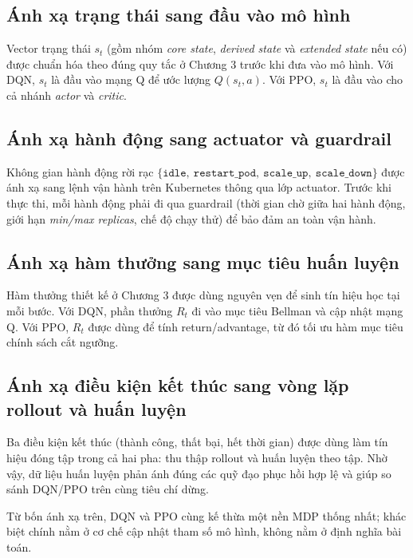 \subsection{Ánh xạ trạng thái sang đầu vào mô hình}

\noindent Vector trạng thái $s_t$ (gồm nhóm \textit{core state}, \textit{derived state} và \textit{extended state} nếu có) được chuẩn hóa theo đúng quy tắc ở Chương 3 trước khi đưa vào mô hình. Với DQN, $s_t$ là đầu vào mạng Q để ước lượng $Q(s_t, a)$. Với PPO, $s_t$ là đầu vào cho cả nhánh \textit{actor} và \textit{critic}.

\subsection{Ánh xạ hành động sang actuator và guardrail}

\noindent Không gian hành động rời rạc $\{\texttt{idle},\ \texttt{restart\_pod},\ \texttt{scale\_up},\ \texttt{scale\_down}\}$ được ánh xạ sang lệnh vận hành trên Kubernetes thông qua lớp actuator. Trước khi thực thi, mỗi hành động phải đi qua guardrail (thời gian chờ giữa hai hành động, giới hạn \textit{min/max replicas}, chế độ chạy thử) để bảo đảm an toàn vận hành.

\subsection{Ánh xạ hàm thưởng sang mục tiêu huấn luyện}

\noindent Hàm thưởng thiết kế ở Chương 3 được dùng nguyên vẹn để sinh tín hiệu học tại mỗi bước. Với DQN, phần thưởng $R_t$ đi vào mục tiêu Bellman và cập nhật mạng Q. Với PPO, $R_t$ được dùng để tính return/advantage, từ đó tối ưu hàm mục tiêu chính sách cắt ngưỡng.

\subsection{Ánh xạ điều kiện kết thúc sang vòng lặp rollout và huấn luyện}

\noindent Ba điều kiện kết thúc (thành công, thất bại, hết thời gian) được dùng làm tín hiệu đóng tập trong cả hai pha: thu thập rollout và huấn luyện theo tập. Nhờ vậy, dữ liệu huấn luyện phản ánh đúng các quỹ đạo phục hồi hợp lệ và giúp so sánh DQN/PPO trên cùng tiêu chí dừng.

\noindent Từ bốn ánh xạ trên, DQN và PPO cùng kế thừa một nền MDP thống nhất; khác biệt chính nằm ở cơ chế cập nhật tham số mô hình, không nằm ở định nghĩa bài toán.

